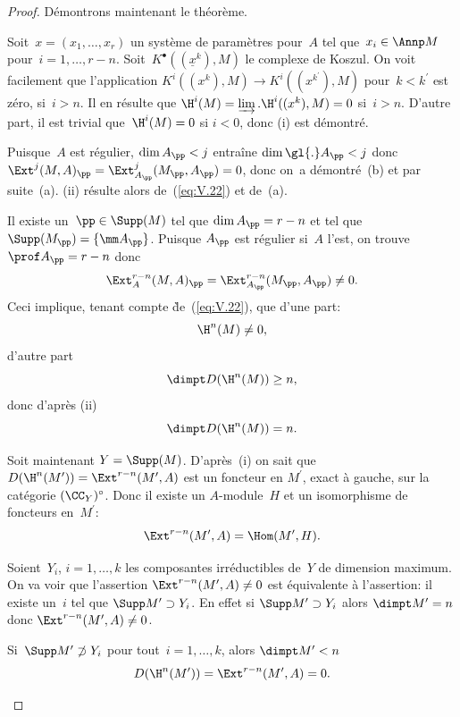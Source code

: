 \begin{proof}
D\'emontrons maintenant le th\'eor\`eme.
\begin{enumeratei}
\item
Soit~$x=(x_{1},\dots, x_{r})$ un syst\`eme de param\`etres pour~$A$ tel que~$x_{i}\in\Annp M$ pour~$i=1,\dots, r-n$. Soit~$K^{\bullet}((\underline{x}^{k}), M)$ le complexe de Koszul. On voit facilement que l'application $K^{i}((x^{k}), M)\to K^{i}((x^{k^{\prime}}), M)$ pour~$k<k^{\prime}$ est z\'ero, si~$i>n$. Il en r\'esulte que $\H^{i}(M)=\varinjlim.\H^{i}((x^{k}), M)=0$ si~$i>n$. D'autre part, il est trivial que~$\H^{i}(M)=0$ si $i<0$, donc (i) est d\'emontr\'e.

\item
Puisque~$A$ est r\'egulier, $\dim A_{\pp}<j$ entra\^ine $\dim\gl{.}A_{\pp}<j$ donc $\Ext^{j}(M, A)_{\pp}=\Ext_{A_{\pp}}^{j}(M_{\pp}, A_{\pp})=0$, donc on~a d\'emontr\'e~(b) et par suite~(a). (ii) r\'esulte alors de~(\ref{eq:V.22}) et de~(a).

\item
Il existe un~$\pp\in\Supp(M)$ tel que $\dim A_{\pp}=r-n$ et tel que $\Supp(M_{\pp})=\{ \mm A_{\pp}\}$. Puisque $A_{\pp}$ est r\'egulier si~$A$ l'est, on trouve $\prof A_{\pp}=r-n$ donc
\begin{equation} \label{eq:V.23} \Ext_{A}^{r-n}(M, A)_{\pp}=\Ext_{A_{\pp}}^{r-n}(M_{\pp}, A_{\pp})\neq 0.
\end{equation}
Ceci implique, tenant compte \`{de}~(\ref{eq:V.22}), que d'une part:
$$
\H^{n}(M)\neq 0,
$$
d'autre part
$$
\dimpt D(\H^{n}(M))\geq n,
$$
donc d'apr\`es (ii)
$$
\dimpt D(\H^{n}(M))=n.
$$

Soit maintenant $Y=\Supp(M)$. D'apr\`es~(i) on sait que $D(\H^{n}(M^{\prime}))=\Ext^{r-n}(M^{\prime}, A)$ est un foncteur en $M^{\prime}$, exact \`a gauche, sur la cat\'egorie $(\CC_{Y})^{\circ}$. Donc il existe un $A$-module~$H$ et un isomorphisme de foncteurs en~$M^{\prime}$:
$$
\Ext^{r-n}(M^{\prime}, A)=\Hom(M^{\prime}, H).
$$

Soient~$Y_{i}$, $i=1,\dots, k$ les composantes irr\'eductibles de~$Y$ de dimension maximum. On va voir que l'assertion $\Ext^{r-n}(M^{\prime}, A)\neq 0$ est \'equivalente \`a l'assertion: il existe un~$i$ tel que $\Supp M^{\prime}\supset Y_{i}$. En effet si $\Supp M^{\prime}\supset Y_{i}$ alors $\dimpt M^{\prime}=n$ donc $\Ext^{r-n}(M^{\prime}, A)\neq 0$.

Si~$\Supp M^{\prime}\not\supset Y_{i}$ pour tout~$i=1,\dots, k$, alors $\dimpt M^{\prime}<n$
$$D(\H^{n}(M^{\prime}))=\Ext^{r-n}(M^{\prime}, A)=0.
$$


\end{enumeratei}
\end{proof}
